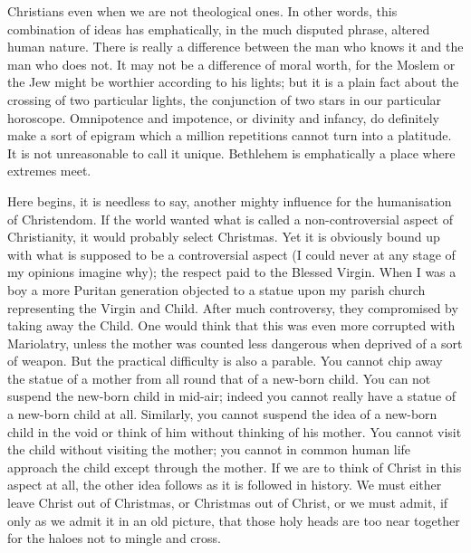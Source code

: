 Christians even when we are not theological ones. In other words, this combination of ideas has emphatically, in the much disputed phrase, altered human nature. There is really a difference between the man who knows it and the man who does not. It may not be a difference of moral worth, for the Moslem or the Jew might be worthier according to his lights; but it is a plain fact about the crossing of two particular lights, the conjunction of two stars in our particular horoscope. Omnipotence and impotence, or divinity and infancy, do definitely make a sort of epigram which a million repetitions cannot turn into a platitude. It is not unreasonable to call it unique. Bethlehem is emphatically a place where extremes meet.

Here begins, it is needless to say, another mighty influence for the humanisation of Christendom. If the world wanted what is called a non-controversial aspect of Christianity, it would probably select Christmas. Yet it is obviously bound up with what is supposed to be a controversial aspect (I could never at any stage of my opinions imagine why); the respect paid to the Blessed Virgin. When I was a boy a more Puritan generation objected to a statue upon my parish church representing the Virgin and Child. After much controversy, they compromised by taking away the Child. One would think that this was even more corrupted with Mariolatry, unless the mother was counted less dangerous when deprived of a sort of weapon. But the practical difficulty is also a parable. You cannot chip away the statue of a mother from all round that of a new-born child. You can not suspend the new-born child in mid-air; indeed you cannot really have a statue of a new-born child at all. Similarly, you cannot suspend the idea of a new-born child in the void or think of him without thinking of his mother. You cannot visit the child without visiting the mother; you cannot in common human life approach the child except through the mother. If we are to think of Christ in this aspect at all, the other idea follows as it is followed in history. We must either leave Christ out of Christmas, or Christmas out of Christ, or we must admit, if only as we admit it in an old picture, that those holy heads are too near together for the haloes not to mingle and cross.

